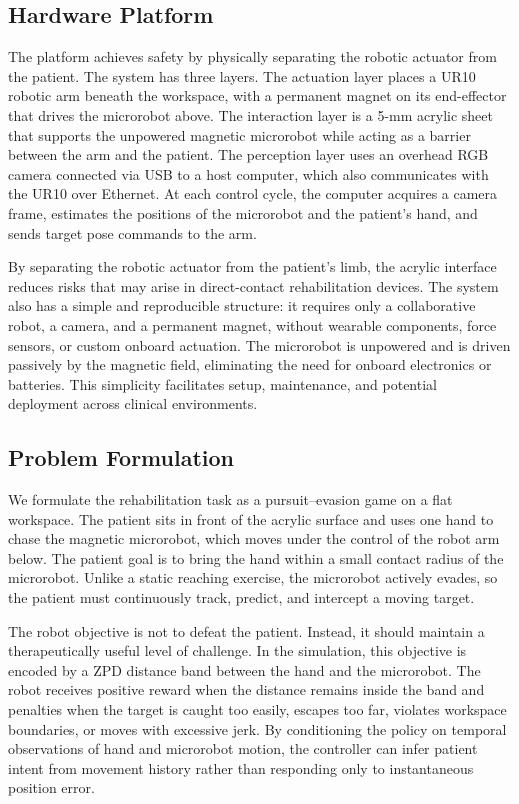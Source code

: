 \documentclass[lettersize,journal]{IEEEtran}
\begin{document}
\subsection{Hardware Platform}
The platform achieves safety by physically separating the robotic actuator from the patient. The system has three layers. The actuation layer places a UR10 robotic arm beneath the workspace, with a permanent magnet on its end-effector that drives the microrobot above. The interaction layer is a 5-mm acrylic sheet that supports the unpowered magnetic microrobot while acting as a barrier between the arm and the patient. The perception layer uses an overhead RGB camera connected via USB to a host computer, which also communicates with the UR10 over Ethernet. At each control cycle, the computer acquires a camera frame, estimates the positions of the microrobot and the patient's hand, and sends target pose commands to the arm.

By separating the robotic actuator from the patient's limb, the acrylic interface reduces risks that may arise in direct-contact rehabilitation devices. The system also has a simple and reproducible structure: it requires only a collaborative robot, a camera, and a permanent magnet, without wearable components, force sensors, or custom onboard actuation. The microrobot is unpowered and is driven passively by the magnetic field, eliminating the need for onboard electronics or batteries. This simplicity facilitates setup, maintenance, and potential deployment across clinical environments.

\subsection{Problem Formulation}
We formulate the rehabilitation task as a pursuit--evasion game on a flat workspace. The patient sits in front of the acrylic surface and uses one hand to chase the magnetic microrobot, which moves under the control of the robot arm below. The patient goal is to bring the hand within a small contact radius of the microrobot. Unlike a static reaching exercise, the microrobot actively evades, so the patient must continuously track, predict, and intercept a moving target.

The robot objective is not to defeat the patient. Instead, it should maintain a therapeutically useful level of challenge. In the simulation, this objective is encoded by a ZPD distance band between the hand and the microrobot. The robot receives positive reward when the distance remains inside the band and penalties when the target is caught too easily, escapes too far, violates workspace boundaries, or moves with excessive jerk. By conditioning the policy on temporal observations of hand and microrobot motion, the controller can infer patient intent from movement history rather than responding only to instantaneous position error.
\end{document}
